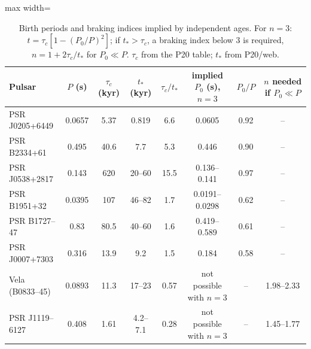 \documentclass[11pt,a4paper]{article}
\begin{document}
\begin{table}[htbp]
\centering\small
\caption{Birth periods and braking indices implied by independent ages. For $n=3$: $t=\tau_c[1-(P_0/P)^2]$; if $t_*>\tau_c$, a braking index below 3 is required, $n=1+2\tau_c/t_*$ for $P_0\ll P$. $\tau_c$ from the P20 table; $t_*$ from P20/web.}\label{tab:birth}
\begin{adjustbox}{max width=\textwidth}\begin{tabular}{lccccccc}
\toprule
Pulsar & $P$ (s) & $\tau_c$ (kyr) & $t_*$ (kyr) & $\tau_c/t_*$ & implied $P_0$ (s), $n=3$ & $P_0/P$ & $n$ needed if $P_0\ll P$\\
\midrule
PSR J0205+6449 & 0.0657 & 5.37 & 0.819 & 6.6 & 0.0605 & 0.92 & --\\
PSR B2334+61 & 0.495 & 40.6 & 7.7 & 5.3 & 0.446 & 0.90 & --\\
PSR J0538+2817 & 0.143 & 620 & 20--60 & 15.5 & 0.136--0.141 & 0.97 & --\\
PSR B1951+32 & 0.0395 & 107 & 46--82 & 1.7 & 0.0191--0.0298 & 0.62 & --\\
PSR B1727--47 & 0.83 & 80.5 & 40--60 & 1.6 & 0.419--0.589 & 0.61 & --\\
PSR J0007+7303 & 0.316 & 13.9 & 9.2 & 1.5 & 0.184 & 0.58 & --\\
Vela (B0833--45) & 0.0893 & 11.3 & 17--23 & 0.57 & not possible with $n=3$ & -- & 1.98--2.33\\
PSR J1119--6127 & 0.408 & 1.61 & 4.2--7.1 & 0.28 & not possible with $n=3$ & -- & 1.45--1.77\\
\bottomrule
\end{tabular}\end{adjustbox}
\end{table}
\end{document}
